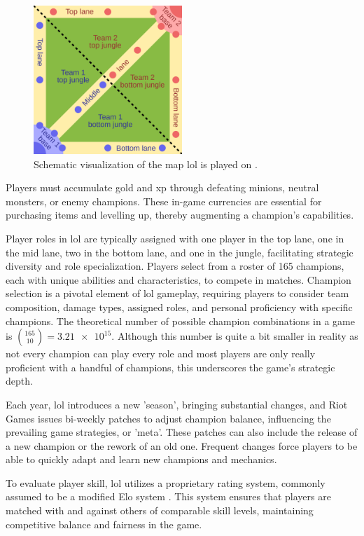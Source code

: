 \documentclass[12pt, a4paper, headinclude, twoside, plainheadsepline, open=right, numbers=noenddot, hidelinks, toc=listof, toc=bibliography]{scrreprt}
\begin{document}
\begin{figure}[htbp]
\centering
\includegraphics[width=0.5\textwidth]{./images/Map_of_MOBA.png}
\caption[Schematic visualization of the map \ac{lol} is played on.]{Schematic visualization of the map \ac{lol} is played on \cite{raizinFileMapMOBA2013}. }
\label{fig:map}
\end{figure}
Players must accumulate gold and \ac{xp} through defeating minions, neutral monsters, or enemy champions. 
These in-game currencies are essential for purchasing items and levelling up, thereby augmenting a champion's capabilities.

Player roles in \ac{lol} are typically assigned with one player in the top lane, one in the mid lane, two in the bottom lane, and one in the jungle, facilitating strategic diversity and role specialization.
Players select from a roster of 165 champions, each with unique abilities and characteristics, to compete in matches.
Champion selection is a pivotal element of \ac{lol} gameplay, requiring players to consider team composition, damage types, assigned roles, and personal proficiency with specific champions. 
The theoretical number of possible champion combinations in a game is $\binom{165}{10} = \num{3.21e15}$.
Although this number is quite a bit smaller in reality as not every champion can play every role and most players are only really proficient with a handful of champions, this underscores the game's strategic depth.

Each year, \ac{lol} introduces a new 'season', bringing substantial changes, and Riot Games issues bi-weekly patches to adjust champion balance, influencing the prevailing game strategies, or 'meta'.
These patches can also include the release of a new champion or the rework of an old one.
Frequent changes force players to be able to quickly adapt and learn new champions and mechanics.

To evaluate player skill, \ac{lol} utilizes a proprietary rating system, commonly assumed to be a modified Elo system \cite{janssonNeuralNetworksStandardizing2022}.
This system ensures that players are matched with and against others of comparable skill levels, maintaining competitive balance and fairness in the game.
\end{document}

